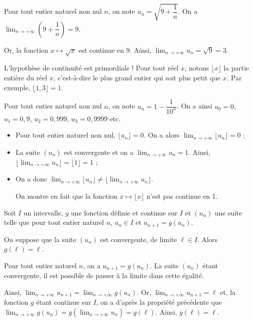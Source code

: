 \documentclass[11pt,fleqn, openany]{book} %
\begin{document}
\begin{example} Pour tout entier naturel non nul $n$, on note $u_n=\sqrt{9+\dfrac{1}{n}}$.
On a $\displaystyle\lim_{n\to +\infty} \left(9+\dfrac{1}{n}\right)=9$. 

Or, la fonction $x\mapsto \sqrt{x}$ est continue en $9$. Ainsi, $\displaystyle\lim_{n \to+\infty}u_n=\sqrt{9}=3$.
\end{example}

L'hypothèse de continuité est primordiale !
Pour tout réel $x$, notons $\lfloor x \rfloor$ la partie entière du réel $x$, c'est-à-dire le plus grand entier qui soit plus petit que $x$. Par exemple, $\lfloor 1,3 \rfloor = 1$.

Pour tout entier naturel non nul $n$, on note $u_n=1-\dfrac{1}{10^n}$. On a ainsi $u_0=0$, $u_1=0,9$, $u_2=0,999$, $u_3=0,9999$ etc.

\begin{itemize}
\item Pour tout entier naturel non nul, $\lfloor u_n \rfloor = 0$. On a alors $\displaystyle\lim_{n\to +\infty} \lfloor u_n \rfloor = 0$ ;
\item La suite $(u_n)$ est convergente et on a $\displaystyle\lim_{n\to +\infty} u_n = 1$. Ainsi, $\lfloor \displaystyle\lim_{n\to +\infty} u_n \rfloor=\lfloor 1 \rfloor=1$ ;
\item On a donc  $\displaystyle\lim_{n\to +\infty} \lfloor u_n \rfloor \neq \lfloor \displaystyle\lim_{n\to +\infty} u_n \rfloor$. 

On montre en fait que la fonction $x\mapsto  \lfloor x \rfloor$ n'est pas continue en 1.
\end{itemize}

\newpage

\begin{theorem}Soit $I$ un intervalle, $g$ une fonction définie et continue sur $I$ et $(u_n)$ une suite telle que pour tout entier naturel $n$, $u_n \in I$ et $u_{n+1}=g(u_n)$.

On suppose que la suite $(u_n)$ est convergente, de limite $\ell\in I$. Alors $g(\ell)=\ell$.\end{theorem}

\begin{demonstration} Pour tout entier naturel $n$, on a $u_{n+1}=g(u_n)$. La suite $(u_n)$ étant convergente, il est possible de passer à la limite dans cette égalité.

Ainsi, $\displaystyle\lim_{n \to +\infty}u_{n+1}=\displaystyle\lim_{n \to +\infty}g(u_n)$. Or, $\displaystyle\lim_{n \to +\infty}u_{n+1}=\ell$ et, la fonction $g$ étant continue sur $I$, on a d'après la propriété précédente que $\displaystyle\lim_{n \to +\infty}g(u_n)=g(\displaystyle\lim_{n \to +\infty}u_n)=g(\ell)$. Ainsi, $g(\ell)=\ell$.
\end{demonstration}
\end{document}
